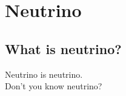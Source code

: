
%
%

\section{Neutrino}\label{AppA}

\subsection{What is neutrino?}
\vs\hs Neutrino is neutrino.\\
Don't you know neutrino?

\newpage
